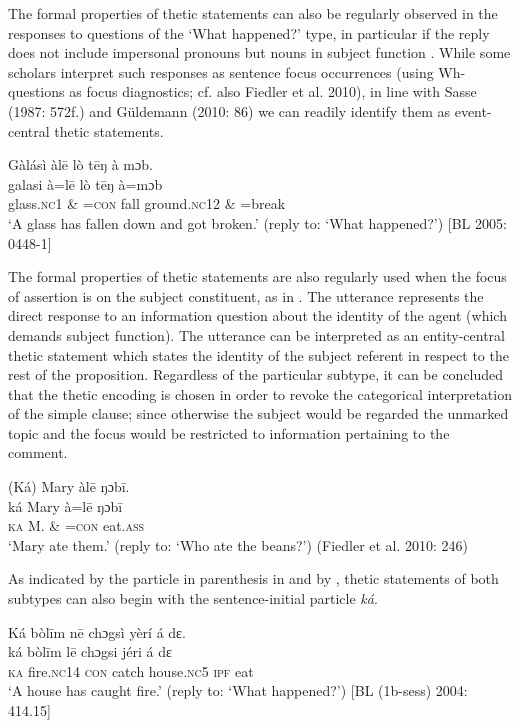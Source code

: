 \documentclass[output=paper]{langsci/langscibook}
\begin{document}
The formal properties of thetic statements can also be regularly observed in the responses to questions of the ‘What happened?’ type, in particular if the reply does not include impersonal pronouns but nouns in subject function . While some scholars interpret such responses as sentence focus occurrences (using Wh-questions as focus diagnostics; cf. also Fiedler et al. 2010), in line with Sasse (1987: 572f.) and Güldemann (2010: 86) we can readily identify them as event-central thetic statements. 

\ea
\glll \textup{}  Gàlásì    àl\={e}    lò  t\={e}ŋ    à   mɔb.\\
  \textup{  galasi}\textup{     à=l\={e}    lò  t\={e}ŋ    à=mɔb}\\
       glass.\textsc{nc}1  \& =\textsc{con}  fall  ground.\textsc{nc}12  \& =break\\
\glt ‘A glass has fallen down and got broken.’ (reply to: ‘What happened?’) [BL  2005: 0448-1]
\z

The formal properties of thetic statements are also regularly used when the focus of assertion is on the subject constituent, as in . The utterance represents the direct response to an information question about the identity of the agent (which demands subject function). The utterance can be interpreted as an entity-central thetic statement which states the identity of the subject referent in respect to the rest of the proposition. Regardless of the particular subtype, it can be concluded that the thetic encoding is chosen in order to revoke the categorical interpretation of the simple clause; since otherwise the subject would be regarded the unmarked topic and the focus would be restricted to information pertaining to the comment. 

\ea
\glll \textup{}  (Ká)  Mary  àl\={e}    ŋɔb\={i}.\\
  \textup{  ká  Mary  à=l\={e}    ŋɔb\={i}}\\
     \textsc{ } \textsc{ka}  M.  \& =\textsc{con}  eat.\textsc{ass}\\
\glt ‘Mary ate them.’ (reply to: ‘Who ate the beans?’) (Fiedler et al. 2010: 246)
\z

As indicated by the particle in parenthesis in  and by , thetic statements of both subtypes can also begin with the sentence-initial particle \textit{ká}. 

\ea
\glll \textup{}  Ká  bòl\={i}m    n\={e}  chɔgsì  yèrí    á  dɛ.\\
  \textup{  ká  bòl\={i}m    l\={e}  chɔgsi  jéri    á  dɛ}\\
     \textsc{  ka}  fire.\textsc{nc}14  \textsc{con}  catch   house.\textsc{nc}5   \textsc{ipf}   eat\\
\glt ‘A house has caught fire.’ (reply to: ‘What happened?’) [BL (1b-sess) 2004: 414.15]
\z
\end{document}
